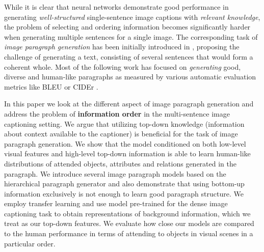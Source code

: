 \documentclass[11pt,a4paper]{article}
\begin{document}

While it is clear that neural networks demonstrate good performance in generating \textit{well-structured} single-sentence image captions with \textit{relevant knowledge}, the problem of selecting and ordering information becomes significantly harder when generating multiple sentences for a single image. The corresponding task of
\textit{image paragraph generation} has been initially introduced in , proposing the challenge of generating a text, consisting of several sentences that would form a coherent whole.
Most of the following work \cite{liang2017recurrent,chatterjee2018diverse,wang2019convolutional} has focused on \textit{generating} good, diverse and human-like paragraphs as measured by various automatic evaluation metrics like BLEU \cite{bleu} or CIDEr \cite{vedantam2014cider}.

In this paper we look at the different aspect of image paragraph generation and address the problem of \textbf{information order} in the multi-sentence image captioning setting.
We argue that utilizing top-down knowledge (information about context available to the captioner) is beneficial for the task of image paragraph generation.
We show that the model conditioned on both low-level visual features and high-level top-down information is able to learn human-like distributions of attended objects, attributes and relations generated in the paragraph.
We introduce several image paragraph models based on the hierarchical paragraph generator  and also
demonstrate that using bottom-up information exclusively is not enough to learn good paragraph structure.
We employ transfer learning and use model pre-trained for the dense image captioning task \cite{densecap} to obtain representations of background information, which we treat as our top-down features.
We evaluate how close our models are compared to the human performance in terms of attending to objects in visual scenes in a particular order.

\fi
\end{document}
